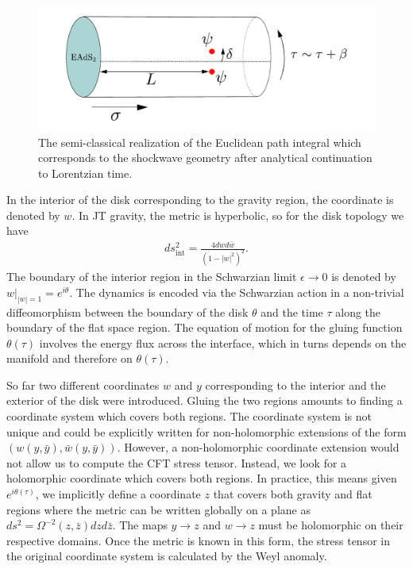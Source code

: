\documentclass[11pt,oneside,letterpaper]{article}
\def\ba{\begin{eqnarray}}
\def\ea{\end{eqnarray}}
\numberwithin{equation}{section}
\def\ba{\begin{eqnarray}}
\def\ea{\end{eqnarray}}
\begin{document}
\begin{spacing}{1.1}
\begin{figure}
\centering 
\includegraphics[scale=0.5]{./figures/cylinder_euc.pdf}
\caption{The semi-classical realization of the Euclidean path integral which corresponds to the shockwave geometry after analytical continuation to Lorentzian time.   }\label{fig:cyl}
\end{figure}


 In the interior of the disk corresponding to the gravity region, the coordinate is denoted by $w$. In JT gravity, the metric is hyperbolic, so for the disk topology we have
 \ba\label{metinwplane}
ds_{\text{int}}^2= \frac{4 dw d\bar{w}}{ (1-|w|^2)^2}.
\ea
 The boundary of the interior region in the Schwarzian limit $\epsilon \to 0$ is denoted by $%
w|_{|w|=1} = e^{ i\theta}$.  The dynamics is encoded via the Schwarzian action in a non-trivial diffeomorphism between the boundary of the disk $\theta$ and the time $ \tau$ along the boundary of the flat space region. The equation of motion for the gluing function $\theta(\tau)$ involves the energy flux across the interface, which in turns depends on the manifold and therefore on $\theta(\tau)$. 



So far two different coordinates $w$ and $y$ corresponding to the interior and the exterior of the disk were introduced.  Gluing the two regions amounts to finding a coordinate system which covers both regions. The coordinate system is not unique and could be explicitly written for non-holomorphic extensions of the form $(w(y, \bar{y}) ,\bar{w}(y, \bar{y}))$.  However, a non-holomorphic coordinate extension would not allow us to compute the CFT stress tensor. Instead, we look for a holomorphic coordinate which covers both regions.  In practice, this means given $e^{i \theta (\tau)}$, we implicitly define a coordinate $z$ that covers both gravity and flat regions where the metric can be written globally on a plane as $ds^2 = \Omega^{-2} (z,\bar{z}) dz d\bar{z}$. The maps $y \to z$ and $w \to z$ must be holomorphic on their respective domains. Once the metric is known in this form, the stress tensor in the original coordinate system is calculated by the Weyl anomaly.


\end{spacing}
\end{document}
